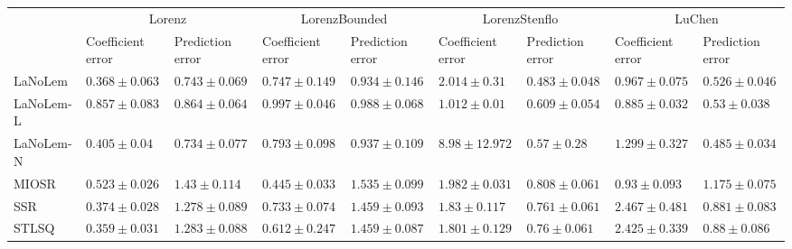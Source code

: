 \begin{table*}
{\begin{tabular}{lllllllll}
 & \multicolumn{2}{c}{Lorenz} & \multicolumn{2}{c}{LorenzBounded} & \multicolumn{2}{c}{LorenzStenflo} & \multicolumn{2}{c}{LuChen} \\
 & Coefficient error & Prediction error & Coefficient error & Prediction error & Coefficient error & Prediction error & Coefficient error & Prediction error \\
\midrule
LaNoLem & $0.368\pm 0.063$ & $0.743\pm 0.069$ & $0.747\pm 0.149$ & $\mathbf{0.934}\pm 0.146$ & $2.014\pm 0.31$ & $\mathbf{0.483}\pm 0.048$ & $0.967\pm 0.075$ & $0.526\pm 0.046$ \\
LaNoLem-L & $0.857\pm 0.083$ & $0.864\pm 0.064$ & $0.997\pm 0.046$ & $0.988\pm 0.068$ & $\mathbf{1.012}\pm 0.01$ & $0.609\pm 0.054$ & $\mathbf{0.885}\pm 0.032$ & $0.53\pm 0.038$ \\
LaNoLem-N & $0.405\pm 0.04$ & $\mathbf{0.734}\pm 0.077$ & $0.793\pm 0.098$ & $0.937\pm 0.109$ & $8.98\pm 12.972$ & $0.57\pm 0.28$ & $1.299\pm 0.327$ & $\mathbf{0.485}\pm 0.034$ \\
MIOSR & $0.523\pm 0.026$ & $1.43\pm 0.114$ & $\mathbf{0.445}\pm 0.033$ & $1.535\pm 0.099$ & $1.982\pm 0.031$ & $0.808\pm 0.061$ & $0.93\pm 0.093$ & $1.175\pm 0.075$ \\
SSR & $0.374\pm 0.028$ & $1.278\pm 0.089$ & $0.733\pm 0.074$ & $1.459\pm 0.093$ & $1.83\pm 0.117$ & $0.761\pm 0.061$ & $2.467\pm 0.481$ & $0.881\pm 0.083$ \\
STLSQ & $\mathbf{0.359}\pm 0.031$ & $1.283\pm 0.088$ & $0.612\pm 0.247$ & $1.459\pm 0.087$ & $1.801\pm 0.129$ & $0.76\pm 0.061$ & $2.425\pm 0.339$ & $0.88\pm 0.086$ \\

\midrule


\end{tabular}}
\end{table*}
